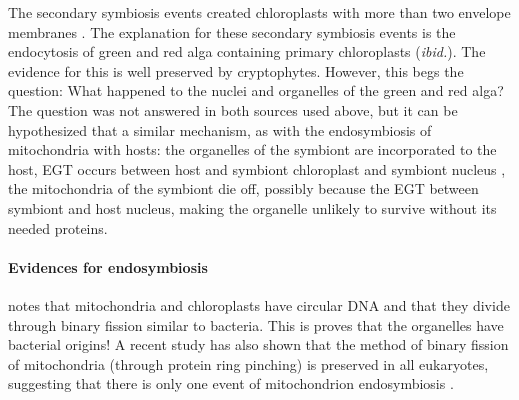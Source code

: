 The secondary symbiosis events created chloroplasts with more than two envelope membranes \cite{endo}.
The explanation for these secondary symbiosis events is the endocytosis of green and red alga containing primary chloroplasts (\textit{ibid.}).
The evidence for this is well preserved by cryptophytes.
However, this begs the question: What happened to the nuclei and organelles of the green and red alga?
The question was not answered in both sources used above, but it can be hypothesized that a similar mechanism, as with the endosymbiosis of mitochondria with hosts:
the organelles of the symbiont are incorporated to the host,
EGT occurs between host and symbiont chloroplast and symbiont nucleus \cite{endo},
the mitochondria of the symbiont die off, possibly because the EGT between symbiont and host nucleus, making the organelle unlikely to survive without its needed proteins.

\paragraph{Evidences for endosymbiosis}
 notes that mitochondria and chloroplasts have circular DNA and that they divide through binary fission similar to bacteria.
This is proves that the organelles have bacterial origins!
A recent study has also shown that the method of binary fission of mitochondria (through protein ring pinching) is preserved in all eukaryotes, suggesting that there is only one event of mitochondrion endosymbiosis \cite{Kato2019}.
